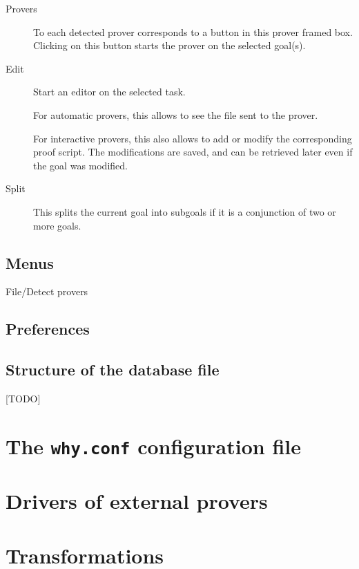 \begin{description}
\item[Provers] To each detected prover corresponds to a button in this
  prover framed box. Clicking on this button starts the prover on the
  selected goal(s).

\item[Edit] Start an editor on the selected task.

  For automatic provers, this allows to see the file sent to the
  prover.

  For interactive provers, this also allows to add or modify the
  corresponding proof script. The modifications are saved, and can be
  retrieved later even if the goal was modified.

\item[Split] This splits the current goal into subgoals if it is a
  conjunction of two or more goals.

\end{description}

\subsection{Menus}

\begin{description}
\item[File/Detect provers] 

\end{description}

\subsection{Preferences}

\subsection{Structure of the database file}

[TODO]

\section{The \texttt{why.conf} configuration file}

\section{Drivers of external provers}

\section{Transformations}

